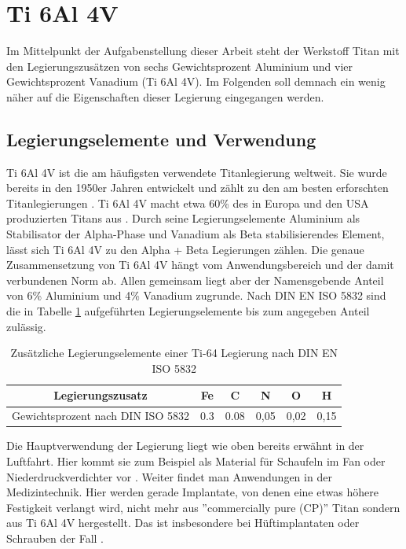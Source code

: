 \documentclass[a4paper, 11pt]{tubsreprt}
\begin{document}
\section{Ti 6Al 4V}\label{Kapitel ti64}
Im Mittelpunkt der Aufgabenstellung dieser Arbeit steht der Werkstoff Titan mit den Legierungszusätzen von sechs Gewichtsprozent Aluminium und vier Gewichtsprozent Vanadium (Ti 6Al 4V). Im Folgenden soll demnach ein wenig näher auf die Eigenschaften dieser Legierung eingegangen werden.  
\subsection{Legierungselemente und Verwendung}
Ti 6Al 4V ist die am häufigsten verwendete Titanlegierung weltweit. Sie wurde bereits in den 1950er Jahren entwickelt und zählt zu den am besten erforschten Titanlegierungen \cite{Leyens2002}. Ti 6Al 4V macht etwa 60\% des in Europa und den USA produzierten Titans aus \cite{Sieniawski2013}. Durch seine Legierungselemente Aluminium als Stabilisator der Alpha-Phase und Vanadium als Beta stabilisierendes Element, lässt sich Ti 6Al 4V zu den Alpha + Beta Legierungen zählen. Die genaue Zusammensetzung von Ti 6Al 4V hängt vom Anwendungsbereich und der damit verbundenen Norm ab. Allen gemeinsam liegt aber der Namensgebende Anteil von 6\% Aluminium und 4\% Vanadium zugrunde. Nach DIN EN ISO 5832 sind die in Tabelle \ref{Tabelle Norm Legierungselemente Ti64} aufgeführten Legierungselemente bis zum angegeben Anteil zulässig.

\begin{table}[t]
\begin{tabular}{c|c|c|c|c|c}
Legierungszusatz & Fe & C & N & O & H \\
\hline
Gewichtsprozent nach DIN ISO 5832 & 0.3 & 0.08 & 0,05 & 0,02 & 0,15 \\
\end{tabular}
\caption{Zusätzliche Legierungselemente einer Ti-64 Legierung nach DIN EN ISO 5832}
\label{Tabelle Norm Legierungselemente Ti64}
\end{table}

Die Hauptverwendung der Legierung liegt wie oben bereits erwähnt in der Luftfahrt. Hier kommt sie zum Beispiel als Material für Schaufeln im Fan oder Niederdruckverdichter vor \cite{Luetjering2007}. Weiter findet man Anwendungen in der Medizintechnik. Hier werden gerade Implantate, von denen eine etwas höhere Festigkeit verlangt wird, nicht mehr aus ''commercially pure (CP)'' Titan sondern aus Ti 6Al 4V hergestellt. Das ist insbesondere bei Hüftimplantaten oder Schrauben der Fall \cite{Luetjering2007}.
\end{document}

